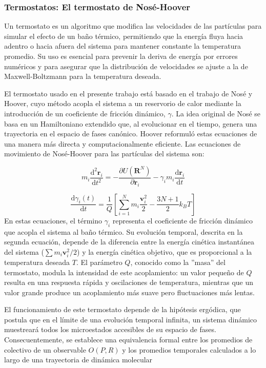 \subsubsection{Termostatos: El termostato de Nosé-Hoover}
\label{section-Termostatos}
Un termostato es un algoritmo que modifica las velocidades de las partículas para simular el efecto de un baño térmico, permitiendo que la energía fluya hacia adentro o hacia afuera del sistema para mantener constante la temperatura promedio. Su uso es esencial para prevenir la deriva de energía por errores numéricos y para asegurar que la distribución de velocidades se ajuste a la de Maxwell-Boltzmann para la temperatura deseada.

El termostato usado en el presente trabajo está basado en el trabajo de Nosé y Hoover, cuyo método acopla el sistema a un reservorio de calor mediante la introducción de un coeficiente de fricción dinámico, $\gamma$. La idea original de Nosé se basa en un Hamiltoniano extendido que, al evolucionar en el tiempo, genera una trayectoria en el espacio de fases canónico. Hoover reformuló estas ecuaciones de una manera más directa y computacionalmente eficiente. Las ecuaciones de movimiento de Nosé-Hoover para las partículas del sistema son:

\begin{equation}
    m_i \frac{\mathrm{d}^2 \mathbf{r}_i}{\mathrm{d}t^2} = -\frac{\partial U(\mathbf{R}^N)}{\partial \mathbf{r}_i} - \gamma_i m_i \frac{\mathrm{d} \mathbf{r}_i}{\mathrm{d}t}
\end{equation}

\begin{equation}
    \frac{\mathrm{d}\gamma_{i}(t)}{\mathrm{d}t} = \frac{1}{Q} \left[ \sum_{i=1}^{N} m_{i} \frac{\mathbf{v}_i^2}{2} - \frac{3N + 1}{2} k_{B} T \right]
\end{equation}
En estas ecuaciones, el término $\gamma_i$ representa el coeficiente de fricción dinámico que acopla el sistema al baño térmico. Su evolución temporal, descrita en la segunda ecuación, depende de la diferencia entre la energía cinética instantánea del sistema ($\sum m_i \mathbf{v}_i^2 / 2$) y la energía cinética objetivo, que es proporcional a la temperatura deseada $T$. El parámetro $Q$, conocido como la ''masa'' del termostato, modula la intensidad de este acoplamiento: un valor pequeño de $Q$ resulta en una respuesta rápida y oscilaciones de temperatura, mientras que un valor grande produce un acoplamiento más suave pero fluctuaciones más lentas.


El funcionamiento de este termostato depende de la hipótesis ergódica, que postula que en el límite de una evolución temporal infinita, un sistema dinámico muestreará todos los microestados accesibles de su espacio de fases. Consecuentemente, se establece una equivalencia formal entre los promedios de colectivo de un observable $O(P, R)$ y los promedios temporales calculados a lo largo de una trayectoria de dinámica molecular \cite{MD-2002-01}

